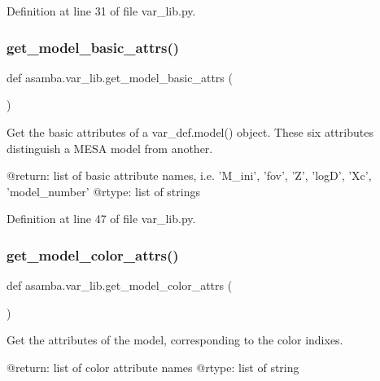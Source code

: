 Definition at line 31 of file var\+\_\+lib.\+py.

\mbox{\label{namespaceasamba_1_1var__lib_a300a7811388375b1f7a3267412235a28}} 
\subsubsection{\texorpdfstring{get\+\_\+model\+\_\+basic\+\_\+attrs()}{get\_model\_basic\_attrs()}}
{\footnotesize\ttfamily def asamba.\+var\+\_\+lib.\+get\+\_\+model\+\_\+basic\+\_\+attrs (\begin{DoxyParamCaption}{ }\end{DoxyParamCaption})}

\begin{DoxyVerb}Get the basic attributes of a var_def.model() object. These six attributes distinguish a MESA 
model from another.

@return: list of basic attribute names, i.e. 'M_ini', 'fov', 'Z', 'logD', 'Xc', 'model_number'
@rtype: list of strings
\end{DoxyVerb}
 

Definition at line 47 of file var\+\_\+lib.\+py.

\mbox{\label{namespaceasamba_1_1var__lib_ac0c467d00e6be1fa027b3a79ef6ef2e2}} 
\subsubsection{\texorpdfstring{get\+\_\+model\+\_\+color\+\_\+attrs()}{get\_model\_color\_attrs()}}
{\footnotesize\ttfamily def asamba.\+var\+\_\+lib.\+get\+\_\+model\+\_\+color\+\_\+attrs (\begin{DoxyParamCaption}{ }\end{DoxyParamCaption})}

\begin{DoxyVerb}Get the attributes of the model, corresponding to the color indixes.

@return: list of color attribute names
@rtype: list of string
\end{DoxyVerb}
 

